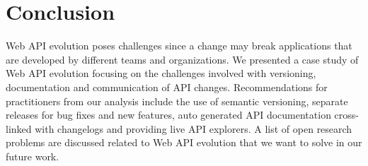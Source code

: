 \section{Conclusion}
Web API evolution poses challenges since a change may break applications that are developed by different teams and organizations. We presented a case study of Web API evolution focusing on the challenges involved with versioning, documentation and communication of API changes. Recommendations for practitioners from our analysis include the use of semantic versioning, separate releases for bug fixes and new features, auto generated API documentation cross-linked with changelogs and providing live API explorers. A list of open research problems are discussed related to Web API evolution that we want to solve in our future work.



